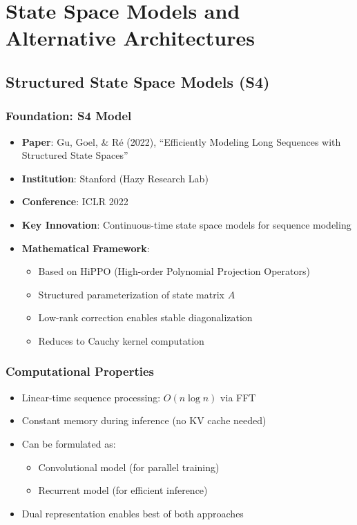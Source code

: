 \documentclass[11pt]{article}
\begin{document}
\section{State Space Models and Alternative Architectures}

\subsection{Structured State Space Models (S4)}

\subsubsection{Foundation: S4 Model}
\begin{itemize}[leftmargin=*]
    \item \textbf{Paper}: Gu, Goel, \& R\'e (2022), ``Efficiently Modeling Long Sequences with Structured State Spaces''~\cite{gu2022efficiently}
    \item \textbf{Institution}: Stanford (Hazy Research Lab)
    \item \textbf{Conference}: ICLR 2022
    \item \textbf{Key Innovation}: Continuous-time state space models for sequence modeling
    \item \textbf{Mathematical Framework}:
    \begin{itemize}
        \item Based on HiPPO (High-order Polynomial Projection Operators)
        \item Structured parameterization of state matrix $A$
        \item Low-rank correction enables stable diagonalization
        \item Reduces to Cauchy kernel computation
    \end{itemize}
\end{itemize}

\subsubsection{Computational Properties}
\begin{itemize}[leftmargin=*]
    \item Linear-time sequence processing: $O(n \log n)$ via FFT
    \item Constant memory during inference (no KV cache needed)
    \item Can be formulated as:
    \begin{itemize}
        \item Convolutional model (for parallel training)
        \item Recurrent model (for efficient inference)
    \end{itemize}
    \item Dual representation enables best of both approaches
\end{itemize}
\end{document}
